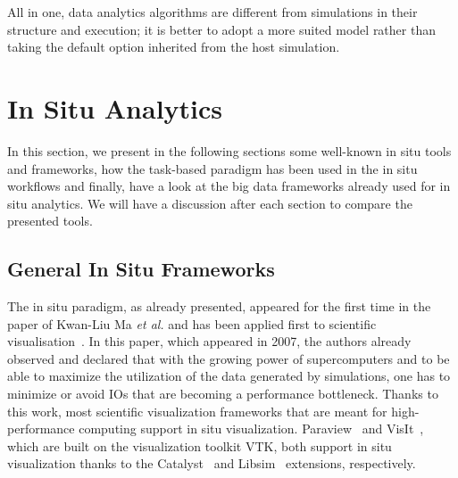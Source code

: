  All in one, data analytics algorithms are different from simulations in their structure and execution; it is better to adopt a more suited model rather than taking the default option inherited from the host simulation.     


\section{In Situ Analytics}
In this section,
we present in the following sections some well-known in situ tools and frameworks, how the task-based paradigm has been used in the in situ workflows and finally, have a look at the big data frameworks already used for in situ analytics. We will have a discussion after each section to compare the presented tools.

\subsection{General In Situ Frameworks}\label{sec:insitu:tools}

The in situ paradigm, as already presented, appeared for the first time in the paper of Kwan-Liu Ma \textit{et al.} and has been applied first to scientific visualisation~\cite{InSituLiuMa:2007}. In this paper, which appeared in 2007, the authors already observed and declared that with the growing power of supercomputers and to be able to maximize the utilization of the data generated by simulations, one has to minimize or avoid IOs that are becoming a performance bottleneck. 
Thanks to this work,  most scientific visualization frameworks that are meant for high-performance computing support in situ visualization. Paraview~\cite{ahrens_paraview_2005} and VisIt~\cite{childs_visit_nodate, noauthor_about_visit, whitlock2010getting}, which are built on the visualization toolkit VTK\cite{noauthor_vtk, schroeder_visualizing_2000_vtk}, both support in situ visualization thanks to the Catalyst~\cite{catalyst11, noauthor_what_catalyst} and  Libsim~\cite{libsim11} extensions, respectively.


